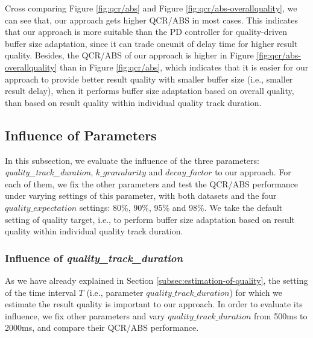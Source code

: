 \documentclass[a4paper, 11pt, twoside]{report}
\begin{document}
Cross comparing Figure \ref{fig:qcr/abs} and Figure \ref{fig:qcr/abs-overallquality}, we can see that, our approach gets higher QCR/ABS in most cases. This indicates that our approach is more suitable than the PD controller for quality-driven buffer size adaptation, since it can trade oneunit of delay time for higher result quality. Besides, the QCR/ABS of our approach is higher in Figure \ref{fig:qcr/abs-overallquality} than in Figure \ref{fig:qcr/abs}, which indicates that it is easier for our approach to provide better result quality with smaller buffer size (i.e., smaller result delay), when it performs buffer size adaptation based on overall quality, than based on result quality within individual quality track duration.\\

\clearpage

\subsection{Influence of Parameters}
\label{subsec:influence-parameters}

In this subsection, we evaluate the influence of the three parameters: \emph{quality\_track\_duration}, $k\_granularity$ and $decay\_factor$ to our approach. For each of them, we fix the other parameters and test the QCR/ABS performance under varying settings of this parameter, with both datasets and the four $quality\_expectation$ settings: 80\%, 90\%, 95\% and 98\%. We take the default setting of quality target, i.e., to perform buffer size adaptation based on result quality within individual quality track duration.\\

\subsubsection{Influence of \textit{quality\_track\_duration}}
\label{subsec:influence-quality-track-duration}

As we have already explained in Section \ref{subsec:estimation-of-quality}, the setting of the time interval $T$ (i.e., parameter $quality\_track\_duration$) for which we estimate the result quality is important to our approach. In order to evaluate its influence, we fix other parameters and vary $quality\_track\_duration$ from 500ms to 2000ms, and compare their QCR/ABS performance.\\
\end{document}
